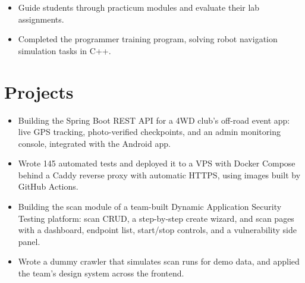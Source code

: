 \vspace{2pt}

\begin{itemize}
    \item Guide students through practicum modules and evaluate their lab assignments.
\end{itemize}

\vspace{2pt}

\begin{itemize}
    \item Completed the programmer training program, solving robot navigation simulation tasks in C++.
\end{itemize}

\section{Projects}

\begin{itemize}
    \item Building the Spring Boot REST API for a 4WD club's off-road event app: live GPS tracking, photo-verified checkpoints, and an admin monitoring console, integrated with the Android app.
    \item Wrote 145 automated tests and deployed it to a VPS with Docker Compose behind a Caddy reverse proxy with automatic HTTPS, using images built by GitHub Actions.
\end{itemize}

\vspace{2pt}

\begin{itemize}
    \item Building the scan module of a team-built Dynamic Application Security Testing platform: scan CRUD, a step-by-step create wizard, and scan pages with a dashboard, endpoint list, start/stop controls, and a vulnerability side panel.
    \item Wrote a dummy crawler that simulates scan runs for demo data, and applied the team's design system across the frontend.
\end{itemize}

